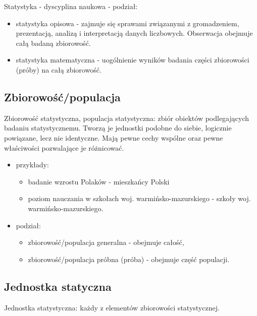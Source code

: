 \documentclass[
  letterpaper,
  DIV=11,
  numbers=noendperiod]{scrreprt}
\providecommand{\tightlist}{%
  \setlength{\itemsep}{0pt}\setlength{\parskip}{0pt}}\usepackage{longtable,booktabs,array}
\begin{document}
Statystyka - dyscyplina naukowa - podział:

\begin{itemize}
\tightlist
\item
  statystyka opisowa - zajmuje się sprawami związanymi z gromadzeniem,
  prezentacją, analizą i interpretacją danych liczbowych. Obserwacja
  obejmuje całą badaną zbiorowość.
\item
  statystyka matematyczna - uogólnienie wyników badania części
  zbiorowości (próby) na całą zbiorowość.
\end{itemize}

\subsection{Zbiorowość/populacja}\label{zbiorowoux15bux107populacja}

Zbiorowość statystyczna, populacja statystyczna: zbiór obiektów
podlegających badaniu statystycznemu. Tworzą je jednostki podobne do
siebie, logicznie powiązane, lecz nie identyczne. Mają pewne cechy
wspólne oraz pewne właściwości pozwalające je różnicować.

\begin{itemize}
\tightlist
\item
  przykłady:

  \begin{itemize}
  \tightlist
  \item
    badanie wzrostu Polaków - mieszkańcy Polski
  \item
    poziom nauczania w szkołach woj. warmińsko-mazurskiego - szkoły woj.
    warmińsko-mazurskiego.
  \end{itemize}
\item
  podział:

  \begin{itemize}
  \tightlist
  \item
    zbiorowość/populacja generalna - obejmuje całość,
  \item
    zbiorowość/populacja próbna (próba) - obejmuje część populacji.
  \end{itemize}
\end{itemize}

\subsection{Jednostka statyczna}\label{jednostka-statyczna}

Jednostka statystyczna: każdy z elementów zbiorowości statystycznej.
\end{document}
